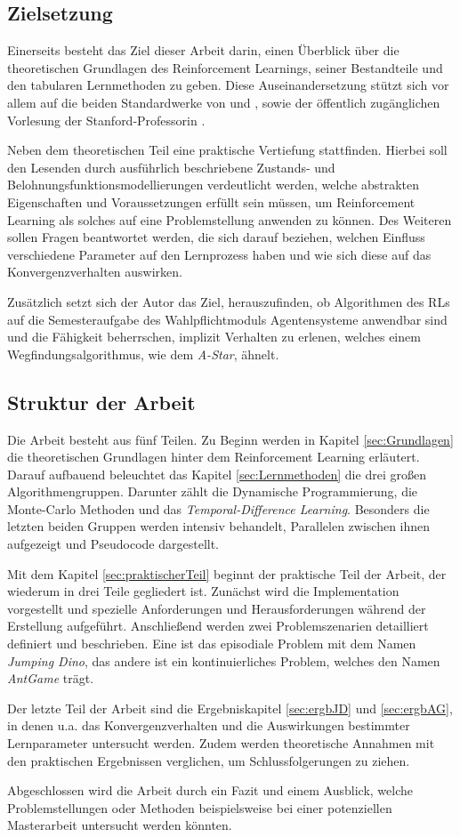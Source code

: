 \subsection{Zielsetzung}
Einerseits besteht das Ziel dieser Arbeit darin, einen Überblick über die theoretischen Grundlagen des Reinforcement Learnings, seiner Bestandteile und den tabularen Lernmethoden zu geben. Diese Auseinandersetzung stützt sich vor allem auf die beiden Standardwerke von \cite{Sutton1998} und \cite{Wiering}, sowie der öffentlich zugänglichen Vorlesung der Stanford-Professorin \cite{Brunskill}.
\par
Neben dem theoretischen Teil eine praktische Vertiefung stattfinden. Hierbei soll den Lesenden durch ausführlich beschriebene Zustands- und Belohnungsfunktionsmodellierungen verdeutlicht werden, welche abstrakten Eigenschaften und Voraussetzungen erfüllt sein müssen, um Reinforcement Learning als solches auf eine Problemstellung anwenden zu können.
Des Weiteren sollen Fragen beantwortet werden, die sich darauf beziehen, welchen Einfluss verschiedene Parameter auf den Lernprozess haben und wie sich diese auf das Konvergenzverhalten auswirken.
\par 
Zusätzlich setzt sich der Autor das Ziel, herauszufinden, ob Algorithmen des RLs auf die Semesteraufgabe des Wahlpflichtmoduls \glqq Agentensysteme\grqq{} anwendbar sind und die Fähigkeit beherrschen, implizit Verhalten zu erlenen, welches einem Wegfindungsalgorithmus, wie dem \textit{A-Star}, ähnelt.

\subsection{Struktur der Arbeit}
Die Arbeit besteht aus fünf Teilen. Zu Beginn werden in Kapitel \ref{sec:Grundlagen} die theoretischen Grundlagen hinter dem Reinforcement Learning erläutert. Darauf aufbauend beleuchtet das Kapitel \ref{sec:Lernmethoden} die drei großen Algorithmengruppen. Darunter zählt die Dynamische Programmierung, die Monte-Carlo Methoden und das \textit{Temporal-Difference Learning}. Besonders die letzten beiden Gruppen werden intensiv behandelt, Parallelen zwischen ihnen aufgezeigt und Pseudocode dargestellt.
\par 
Mit dem Kapitel \ref{sec:praktischerTeil} beginnt der praktische Teil der Arbeit, der wiederum in drei Teile gegliedert ist. 
\newpage 
Zunächst wird die Implementation vorgestellt und spezielle Anforderungen und Herausforderungen während der Erstellung aufgeführt. Anschließend werden zwei Problemszenarien detailliert definiert und beschrieben. Eine ist das episodiale Problem mit dem Namen \textit{Jumping Dino}, das andere ist ein kontinuierliches Problem, welches den Namen \textit{AntGame} trägt.
\par 
Der letzte Teil der Arbeit sind die Ergebniskapitel \ref{sec:ergbJD} und \ref{sec:ergbAG}, in denen u.a. das Konvergenzverhalten und die Auswirkungen bestimmter Lernparameter untersucht werden. Zudem werden theoretische Annahmen mit den praktischen Ergebnissen verglichen, um Schlussfolgerungen zu ziehen.
\par 
Abgeschlossen wird die Arbeit durch ein Fazit und einem Ausblick, welche Problemstellungen oder Methoden beispielsweise bei einer potenziellen Masterarbeit untersucht werden könnten.